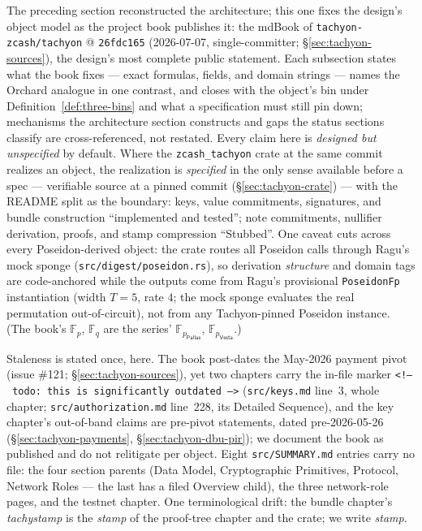 \documentclass[11pt,a4paper]{article}
\theoremstyle{definition}
\newcommand{\F}{\mathbb{F}}
\newcommand{\Pallas}{\ensuremath{\mathsf{Pallas}}}
\newcommand{\Vesta}{\ensuremath{\mathsf{Vesta}}}
\begin{document}
The preceding section reconstructed the architecture; this one fixes the
design's object model as the project book publishes it: the mdBook of
\texttt{tachyon-zcash/tachyon} @ \texttt{26fdc165} (2026-07-07,
single-committer; \S\ref{sec:tachyon-sources}), the design's most complete
public statement. Each subsection states what the book fixes --- exact
formulas, fields, and domain strings --- names the Orchard analogue in one
contrast, and closes with the object's bin under
Definition~\ref{def:three-bins} and what a specification must still pin
down; mechanisms the architecture section constructs and gaps the status
sections classify are cross-referenced, not restated. Every claim here is
\emph{designed but unspecified} by default. Where the
\texttt{zcash\_tachyon} crate at the same commit realizes an object, the
realization is \emph{specified} in the only sense available before a spec
--- verifiable source at a pinned commit (\S\ref{sec:tachyon-crate}) ---
with the README split as the boundary: keys, value commitments, signatures,
and bundle construction ``implemented and tested''; note commitments,
nullifier derivation, proofs, and stamp compression ``Stubbed''. One caveat
cuts across every Poseidon-derived object: the crate routes all Poseidon
calls through Ragu's mock sponge (\texttt{src/digest/poseidon.rs}), so
derivation \emph{structure} and domain tags are code-anchored while the
outputs come from Ragu's provisional \texttt{PoseidonFp} instantiation
(width $T = 5$, rate $4$; the mock sponge evaluates the real permutation
out-of-circuit), not from any Tachyon-pinned Poseidon instance. (The
book's $\F_p$, $\F_q$ are the series' $\F_{p_{\Pallas}}$,
$\F_{p_{\Vesta}}$.)

Staleness is stated once, here. The book post-dates the May-2026 payment
pivot (issue \#121; \S\ref{sec:tachyon-sources}), yet two chapters carry
the in-file marker \texttt{<!--\ todo: this is significantly outdated -->}
(\texttt{src/keys.md} line~3, whole chapter; \texttt{src/authorization.md}
line~228, its Detailed Sequence), and the key chapter's out-of-band claims
are pre-pivot statements, dated pre-2026-05-26
(\S\ref{sec:tachyon-payments}, \S\ref{sec:tachyon-dbu-pir}); we document
the book as published and do not relitigate per object. Eight
\texttt{src/SUMMARY.md} entries carry no file: the four section parents
(Data Model, Cryptographic Primitives, Protocol, Network Roles --- the
last has a filed Overview child), the three network-role pages, and the
testnet chapter. One terminological drift: the bundle chapter's
\emph{tachystamp} is the \emph{stamp} of the proof-tree chapter and the
crate; we write \emph{stamp}.
\end{document}
